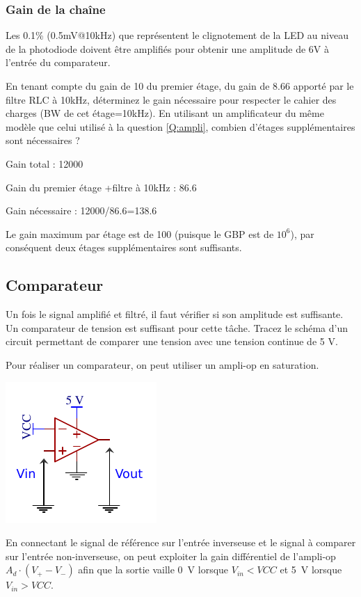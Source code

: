 \documentclass{../template/tp}
\begin{document}
 \subsubsection{Gain de la chaîne}

 Les 0.1\% (0.5mV@10kHz) que représentent le clignotement de la LED au niveau de la photodiode doivent être amplifiés pour obtenir une amplitude de 6V à l'entrée du comparateur.

 \Question
 {
 En tenant compte du gain de 10 du premier étage, du gain de 8.66 apporté par le filtre RLC à 10kHz, déterminez le gain nécessaire pour respecter le cahier des charges (BW de cet étage=10kHz). En utilisant un amplificateur du même modèle que celui utilisé à la question \ref{Q:ampli}, combien d'étages supplémentaires sont nécessaires ?

 }
 {%
 Gain total : 12000

 Gain du premier étage +filtre à 10kHz : 86.6

 Gain nécessaire : 12000/86.6=138.6

 Le gain maximum par étage est de 100 (puisque le GBP est de $10^6$), par conséquent deux étages supplémentaires sont suffisants.
 }

\subsection{Comparateur}
Un fois le signal amplifié et filtré, il faut vérifier si son amplitude est suffisante. Un comparateur de tension est suffisant pour cette tâche.
\Question
{
Tracez le schéma d'un circuit permettant de comparer une tension avec une tension continue de 5 V.
}
{%
Pour réaliser un comparateur, on peut utiliser un ampli-op en saturation.

\begin{center}
	\includegraphics[scale=1.4]{comparateur.pdf}
\end{center}

En connectant le signal de référence sur l'entrée inverseuse et le signal à comparer sur l'entrée non-inverseuse, on peut exploiter la gain différentiel de l'ampli-op $A_d \cdot (V_+ - V_-)$ afin que la sortie vaille 0~V lorsque $V_{in} < VCC$ et 5~V lorsque $V_{in} > VCC$.
}
%
\end{document}
